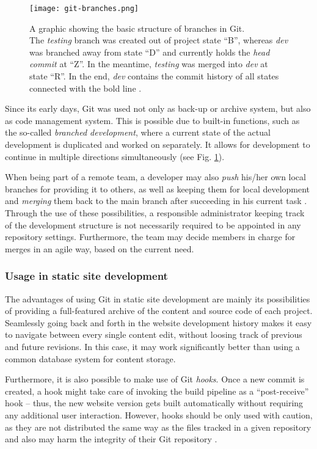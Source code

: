 \begin{figure} %
    \centering
    \texttt{[image: git-branches.png]}
    \caption{A graphic showing the basic structure of branches in Git.\\
    The \emph{testing} branch was created out of project state ``B'', whereas \emph{dev} was branched away from state ``D'' and currently holds the \emph{head commit} at ``Z''. In the meantime, \emph{testing} was merged into \emph{dev} at state ``R''. In the end, \emph{dev} contains the commit history of all states connected with the bold line \cite[p. 92f]{loeliger2012version}.}
    \label{fig:git-branches}
\end{figure}
%

Since its early days, Git was used not only as back-up or archive system, but also as code management system. This is possible due to built-in functions, such as the so-called \emph{branched development}, where a current state of the actual development is duplicated and worked on separately. It allows for development to continue in multiple directions simultaneously \cite[89]{loeliger2012version} (see Fig. \ref{fig:git-branches}).

When being part of a remote team, a developer may also \emph{push} his/her own local branches for providing it to others, as well as keeping them for local development and \emph{merging} them back to the main branch after succeeding in his current task \cite[207]{dhillon2016}. Through the use of these possibilities, a responsible administrator keeping track of the development structure is not necessarily required to be appointed in any repository settings. Furthermore, the team may decide members in charge for merges in an agile way, based on the current need.

\subsubsection{Usage in static site development}
The advantages of using Git in static site development are mainly its possibilities of providing a full-featured archive of the content and source code of each project. Seamlessly going back and forth in the website development history makes it easy to navigate between every single content edit, without loosing track of previous and future revisions. In this case, it may work significantly better than using a common database system for content storage.

Furthermore, it is also possible to make use of Git \emph{hooks}. Once a new commit is created, a hook might take care of invoking the build pipeline as a ``post-receive'' hook -- thus, the new website version gets built automatically without requiring any additional user interaction. However, hooks should be only used with caution, as they are not distributed the same way as the files tracked in a given repository and also may harm the integrity of their Git repository \cite[p. 285f]{loeliger2012version}.
